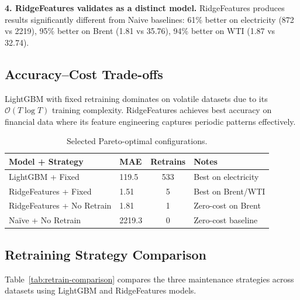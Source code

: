 \documentclass[conference]{IEEEtran}
\begin{document}
\textbf{4. RidgeFeatures validates as a distinct model.} RidgeFeatures produces
results significantly different from Naive baselines: 61\% better on
electricity (872 vs 2219), 95\% better on Brent (1.81 vs 35.76), 94\% better on WTI (1.87 vs 32.74).

\subsection{Accuracy--Cost Trade-offs}

LightGBM with fixed retraining dominates on volatile datasets due to
its $\mathcal{O}(T \log T)$ training complexity. RidgeFeatures achieves
best accuracy on financial data where its feature engineering captures
periodic patterns effectively.

\begin{table}[!t]
	\centering
	\caption{Selected Pareto-optimal configurations.}
	\label{tab:frontier}
	\begin{tabular}{llcl}
		\toprule
		Model + Strategy           & MAE    & Retrains & Notes               \\
		\midrule
		LightGBM + Fixed           & 119.5  & 533      & Best on electricity \\
		RidgeFeatures + Fixed      & 1.51   & 5        & Best on Brent/WTI   \\
		RidgeFeatures + No Retrain & 1.81   & 1        & Zero-cost on Brent  \\
		Na\"{i}ve + No Retrain     & 2219.3 & 0        & Zero-cost baseline  \\
		\bottomrule
	\end{tabular}
\end{table}

\subsection{Retraining Strategy Comparison}

Table~\ref{tab:retrain-comparison} compares the three maintenance
strategies across datasets using LightGBM and RidgeFeatures models.
\end{document}
